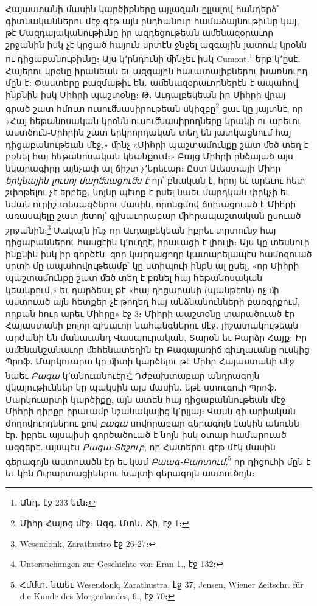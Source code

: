 \documentclass{article}
\begin{document}
{Հայաստանի մասին կարծիքները այլազան ըլլալով հանդերձ՝ գիտնականներու մէջ գէթ այն ընդհանուր համաձայնութիւնը կայ, թէ Մազդայականութիւնը իր ազդեցութեան աﬔնազօրաւոր շրջանին իսկ չէ կրցած հայուն սրտէն ջնջել ազգային յատուկ կրօնն ու դիցաբանութիւնը։ Այս կ՚րնդունի ﬕնչեւ իսկ Cumont,\footnote{Անդ․ էջ 233 եւն։} երբ կ՚ըսէ․ Հայերու կրօնը իրանեան եւ ազգային հաւատալիքներու խառնուրդ մըն է։ Փաստերը բազմաթիւ են․ աﬔնազօրաւորներէն է ապահով ինքնին իսկ Միհրի պաշտօնը։ Թ․ Աւդալբեկեան իր Միհրի վրայ գրած շատ հմուտ ուսուﬓասիրութեան սկիզբը\footnote{Միհր Հայոց մէջ։ Ազգ․ Մտն․ Ճի, էջ 1։} ցաւ կը յայտնէ, որ «Հայ հեթանոսական կրօնն ուսուﬓասիրողները կրակի ու արեւու աստծուն֊Միհրին շատ երկրորդական տեղ են յատկացնում հայ դիցաբանութեան մէջ,» ﬕնչ «Միհրի պաշտամունքը շատ ﬔծ տեղ է բռնել հայ հեթանոսական կեանքում։» Բայց Միհրի ընծայած այս նկարագիրը այնչափ ալ ճիշտ չ՚երեւար։ Ըստ Աւեստայի Միհր \emph{երկնային լուսոյ մարﬓացուﬓ է} որ՝ բնական է, հրոյ եւ արեւու հետ շփոթելու չէ երբեք․ նոյնը պէտք է ըսել նաեւ մարդկան փրկչի եւ նման ուրիշ տեսագծերու մասին, որոնցմով ճոխացուած է Միհրի առասպելը շատ յետոյ՝ գլխաւորաբար ﬕհրապաշտական ըսուած շրջանին։\footnote{Wesendonk, Zarathustro էջ 26֊27։} Սակայն ինչ որ Աւդալբեկեան իբրեւ տրտունջ հայ դիցաբաններու հասցէին կ՚ուղղէ, իրաւացի է լիուլի։ Այս կը տեսնուի ինքնին իսկ իր գործէն, զոր կարդացողը կատարելապէս համոզուած սրտի մը ապահովութեամբ՝ կը ստիպուի ինքն ալ ըսել, «որ Միհրի պաշտամունքը շատ ﬔծ տեղ է բռնել հայ հեթանոսական կեանքում,» եւ դարձեալ թէ «հայ դիցարանի (պանթէոն) ոչ ﬕ աստուած այն հետքեր չէ թողեղ հայ անձնանունների բառգրքում, որքան հուր արեւ Միհրը» էջ 3։ Միհրի պաշտօնը տարածուած էր Հայաստանի բոլոր գլխաւոր նահանգներու մէջ․ յիշատակութեան արժանի են մանաւանդ Վասպուրական, Տարօն եւ Բարձր Հայք։ Իր աﬔնանշանաւոր ﬔհենատեղին էր Բագայառիճ գիւղաւանը ուսկից Պրոֆ․ Մարկուարտ կը ﬕտի կարծելու թէ Միհր Հայաստանի մէջ նաեւ \emph{Բագա} կ՚անուանուէր։\footnote{Untersuchungen zur Geschichte von Eran 1., էջ 132։} Դժբախտաբար անդրագոյն վկայութիւններ կը պակսին այս մասին․ եթէ ստուգուի Պրոֆ․ Մարկուարտի կարծիքը, այն ատեն հայ դիցաբաննութեան մէջ Միհրի դիրքը իրաւամբ նշանակալից կ՚ըլլայ։ Վասն զի արիական ժողովուրդներու քով \emph{բագա} սովորաբար գերագոյն էակին անունն էր․ իբրեւ այսպիսի գործածուած է նոյն իսկ օտար համարուած ազգերէ․ այսպէս \emph{Բագա֊Տեշուբ}, որ Հատերու գէթ մէկ մասին գերագոյն աստուածն էր եւ կամ \emph{Բաագ֊Բարտում},\footnote{Հմմտ․ նաեւ Wesendonk, Zarathustra, էջ 37, Jensen, Wiener Zeitschr. für die Kunde des Morgenlandes, 6., էջ 70։} որ դիցուհի մըն է եւ կին Ուրարտացիներու Խալտի գերագոյն աստուծոյն։

}
\end{document}
